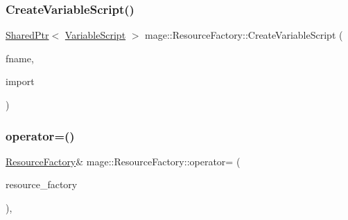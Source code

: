 \hypertarget{classmage_1_1_resource_factory_a523e3f76a3d8347f6d75a7b87a291b1e}{}\label{classmage_1_1_resource_factory_a523e3f76a3d8347f6d75a7b87a291b1e} 
\subsubsection{\texorpdfstring{Create\+Variable\+Script()}{CreateVariableScript()}}
{\footnotesize\ttfamily \hyperlink{namespacemage_a1e01ae66713838a7a67d30e44c67703e}{Shared\+Ptr}$<$ \hyperlink{classmage_1_1_variable_script}{Variable\+Script} $>$ mage\+::\+Resource\+Factory\+::\+Create\+Variable\+Script (\begin{DoxyParamCaption}\item[{const wstring \&}]{fname,  }\item[{bool}]{import }\end{DoxyParamCaption})}

\hypertarget{classmage_1_1_resource_factory_a1a99724dd744fde5ce2a1488966b30d0}{}\label{classmage_1_1_resource_factory_a1a99724dd744fde5ce2a1488966b30d0} 
\subsubsection{\texorpdfstring{operator=()}{operator=()}\hspace{0.1cm}{\footnotesize\ttfamily [1/2]}}
{\footnotesize\ttfamily \hyperlink{classmage_1_1_resource_factory}{Resource\+Factory}\& mage\+::\+Resource\+Factory\+::operator= (\begin{DoxyParamCaption}\item[{const \hyperlink{classmage_1_1_resource_factory}{Resource\+Factory} \&}]{resource\+\_\+factory }\end{DoxyParamCaption})\hspace{0.3cm}{\ttfamily [private]}, {\ttfamily [delete]}}

\hypertarget{classmage_1_1_resource_factory_a4a1a0c064f068329f4b94c47ec17046f}{}\label{classmage_1_1_resource_factory_a4a1a0c064f068329f4b94c47ec17046f} 
